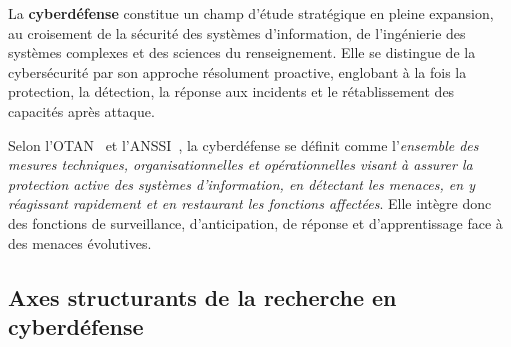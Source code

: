 \documentclass[ twoside,openright,titlepage,numbers=noenddot,headinclude,%
                footinclude=true,cleardoublepage=empty,abstractoff, %
                BCOR=5mm,paper=a4,fontsize=11pt,%
                french,american,%
                ]{scrreprt}
\begin{document}



La \textbf{cyberdéfense} constitue un champ d'étude stratégique en pleine expansion, au croisement de la sécurité des systèmes d'information, de l'ingénierie des systèmes complexes et des sciences du renseignement. Elle se distingue de la cybersécurité par son approche résolument proactive, englobant à la fois la protection, la détection, la réponse aux incidents et le rétablissement des capacités après attaque.

Selon l'OTAN~\cite{NATO2016Cyberdef} et l'ANSSI~\cite{ANSSI2020}, la cyberdéfense se définit comme l'\emph{ensemble des mesures techniques, organisationnelles et opérationnelles visant à assurer la protection active des systèmes d'information, en détectant les menaces, en y réagissant rapidement et en restaurant les fonctions affectées}. Elle intègre donc des fonctions de surveillance, d'anticipation, de réponse et d'apprentissage face à des menaces évolutives.


\subsection*{Axes structurants de la recherche en cyberdéfense}
\end{document}
